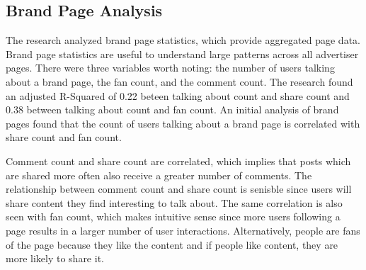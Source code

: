 \documentclass{article}
\begin{document}
\subsection{Brand Page Analysis}


The research analyzed brand page statistics, which provide aggregated page data. Brand page statistics are useful to understand large patterns across all advertiser pages. There were three variables worth noting: the number of users talking about a brand page, the fan count, and the comment count. The research found an adjusted R-Squared of 0.22 beteen talking about count and share count and 0.38 between talking about count and fan count. An initial analysis of brand pages found that the count of users talking about a brand page is correlated with share count and fan count.



Comment count and share count are correlated, which implies that posts which are shared more often also receive a greater number of comments. The relationship between comment count and share count is senisble since users will share content they find interesting to talk about. The same correlation is also seen with fan count, which makes intuitive sense since more users following a page results in a larger number of user interactions. Alternatively, people are fans of the page because they like the content and if people like content, they are more likely to share it.
\end{document}
